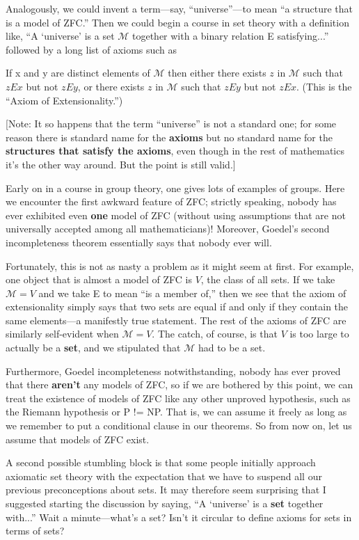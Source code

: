 \documentclass[10pt]{article}
\newcommand\axiom[1]{\textmd{#1}}
\theoremstyle{definition}
\begin{document}
Analogously, we could invent a term---say, ``universe''---to mean ``a structure that is a model of \axiom{ZFC}.'' Then we could begin a course in set theory with a definition like, ``A `universe' is a set $\mathcal M$ together with a binary relation E satisfying...'' followed by a long list of axioms such as

 If x and y are distinct elements of $\mathcal M$ then either there
 exists $z$ in $\mathcal M$ such that $z E x$ but not $z E y$, or there
 exists $z$ in $\mathcal M$ such that $z E y$ but not $z E x$. (This is
 the ``Axiom of Extensionality.'')

[Note: It so happens that the term ``universe'' is not a standard one; for some reason there is standard name for the \textbf{axioms} but no standard name for the \textbf{structures that satisfy the axioms}, even though in the rest of mathematics it's the other way around. But the point is still valid.]

Early on in a course in group theory, one gives lots of examples of groups. Here we encounter the first awkward feature of \axiom{ZFC}; strictly speaking, nobody has ever exhibited even \textbf{one} model of \axiom{ZFC} (without using assumptions that are not universally accepted among all mathematicians)! Moreover, Goedel's second incompleteness theorem essentially says that nobody ever will.

Fortunately, this is not as nasty a problem as it might seem at first. For example, one object that is almost a model of \axiom{ZFC} is $V$, the class of all sets. If we take $\mathcal M = V$ and we take E to mean ``is a member of,'' then we see that the axiom of extensionality simply says that two sets are equal if and only if they contain the same elements---a manifestly true statement. The rest of the axioms of \axiom{ZFC} are similarly self-evident when $\mathcal M = V$. The catch, of course, is that $V$ is too large to actually be a \textbf{set}, and we stipulated that $\mathcal M$ had to be a set.

Furthermore, Goedel incompleteness notwithstanding, nobody has ever proved that there \textbf{aren't} any models of \axiom{ZFC}, so if we are bothered by this point, we can treat the existence of models of \axiom{ZFC} like any other unproved hypothesis, such as the Riemann hypothesis or P != NP. That is, we can assume it freely as long as we remember to put a conditional clause in our theorems. So from now on, let us assume that models of \axiom{ZFC} exist.

A second possible stumbling block is that some people initially approach axiomatic set theory with the expectation that we have to suspend all our previous preconceptions about sets. It may therefore seem surprising that I suggested starting the discussion by saying, ``A `universe' is a \textbf{set} together with...'' Wait a minute---what's a set? Isn't it circular to define axioms for sets in terms of sets?
\end{document}
